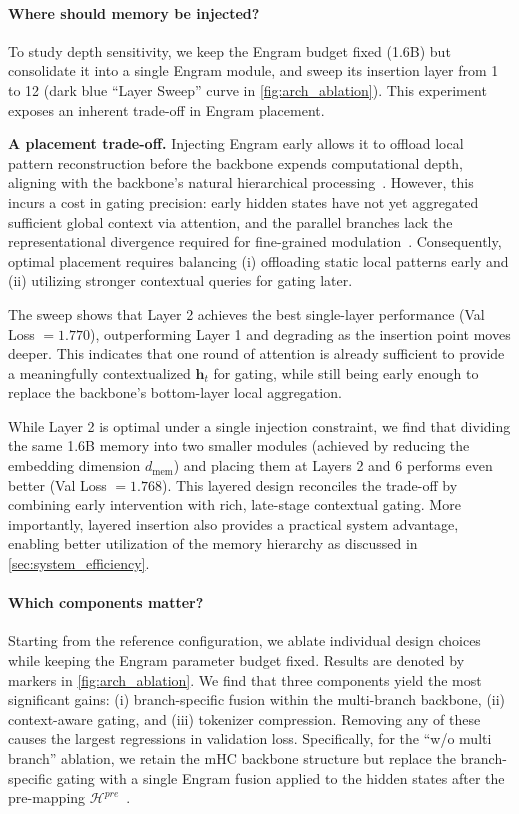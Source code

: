 \paragraph{Where should memory be injected?}
To study depth sensitivity, we keep the Engram budget fixed (1.6B) but consolidate it into a single Engram module,
and sweep its insertion layer from 1 to 12 (dark blue ``Layer Sweep'' curve in \autoref{fig:arch_ablation}).
This experiment exposes an inherent trade-off in Engram placement.

\textbf{A placement trade-off.}
Injecting Engram early allows it to offload local pattern reconstruction before the backbone expends computational depth, aligning with the backbone's natural hierarchical processing~\citep{tenney2019bert,ghandeharioun2024patchscopes,li2025echoesbertmodernlanguage,DBLP:conf/coling/JinYHZWH0MMDYDZ25}.
However, this incurs a cost in gating precision: early hidden states have not yet aggregated sufficient global context via attention, and the parallel branches lack the representational divergence required for fine-grained modulation~\citep{xie2025mhcmanifoldconstrainedhyperconnections,zhu2025hyperconnections}.
Consequently, optimal placement requires balancing (i) offloading static local patterns early and (ii) utilizing stronger contextual queries for gating later.

The sweep shows that Layer 2 achieves the best single-layer performance (Val Loss $= 1.770$), outperforming Layer 1 and
degrading as the insertion point moves deeper.
This indicates that one round of attention is already sufficient to provide a meaningfully contextualized $\mathbf{h}_t$ for gating,
while still being early enough to replace the backbone's bottom-layer local aggregation.

While Layer 2 is optimal under a single injection constraint, we find that dividing the same 1.6B memory into two smaller
modules (achieved by reducing the embedding dimension $d_{\text{mem}}$) and placing them at Layers 2 and 6 performs even better (Val Loss $=1.768$).
This layered design reconciles the trade-off by combining early intervention with rich, late-stage contextual gating.
More importantly, layered insertion also provides a practical system advantage, enabling better utilization of the memory hierarchy as discussed in \autoref{sec:system_efficiency}.

\paragraph{Which components matter?}
Starting from the reference configuration, we ablate individual design choices while
keeping the Engram parameter budget fixed. Results are denoted by markers in \autoref{fig:arch_ablation}.
We find that three components yield the most significant gains:
(i) branch-specific fusion within the multi-branch backbone,
(ii) context-aware gating, and
(iii) tokenizer compression.
Removing any of these causes the largest regressions in validation loss.
Specifically, for the ``w/o multi branch'' ablation, we retain the mHC backbone structure but replace the branch-specific gating with a single Engram fusion applied to the hidden states after the pre-mapping $\mathcal{H}^{pre}$~\citep{xie2025mhcmanifoldconstrainedhyperconnections}.

